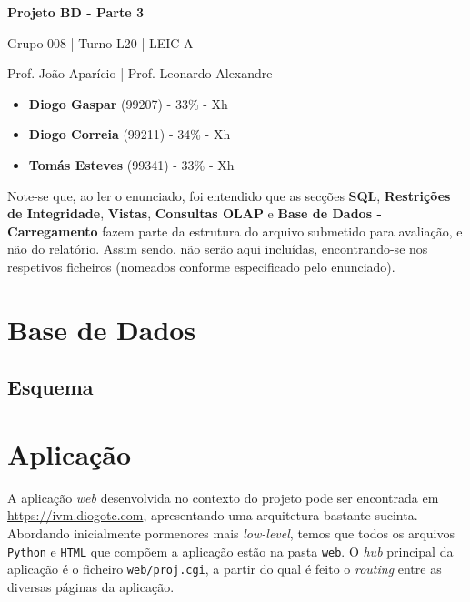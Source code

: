 \documentclass[12pt,a4paper]{article}
\begin{document}
  \begin{titlepage}
    \begin{center}
      \vspace*{5cm}

      \Huge
      \textbf{Projeto BD - Parte 3}

      \vspace{0.5cm}
      \LARGE
      Grupo 008 | Turno L20 | LEIC-A

      \vspace{0.5cm}
      \large
      Prof. João Aparício | Prof. Leonardo Alexandre

      \vfill
    \end{center}
    \large
    \begin{itemize}
      \item[] \textbf{Diogo Gaspar} (99207) - 33\% - Xh
      \item[] \textbf{Diogo Correia} (99211) - 34\% - Xh
      \item[] \textbf{Tomás Esteves} (99341) - 33\% - Xh
    \end{itemize}
  \end{titlepage}

  Note-se que, ao ler o enunciado, foi entendido que as secções \textbf{SQL},
  \textbf{Restrições de Integridade}, \textbf{Vistas}, \textbf{Consultas OLAP}
  e \textbf{Base de Dados - Carregamento} fazem parte da estrutura do arquivo
  submetido para avaliação, e não do relatório. Assim sendo, não serão aqui
  incluídas, encontrando-se nos respetivos ficheiros (nomeados conforme especificado
  pelo enunciado).

  \section*{Base de Dados}

  \subsection*{Esquema}


  
  
  \section*{Aplicação}

  A aplicação \textit{web} desenvolvida no contexto do projeto pode ser encontrada
  em \url{https://ivm.diogotc.com}, apresentando uma arquitetura bastante sucinta.
  Abordando inicialmente pormenores mais \textit{low-level}, temos que todos os arquivos
  \texttt{Python} e \texttt{HTML} que compõem a aplicação estão na pasta \texttt{web}.
  O \textit{hub} principal da aplicação é o ficheiro \texttt{web/proj.cgi}, a partir do qual
  é feito o \textit{routing} entre as diversas páginas da aplicação.
\end{document}
